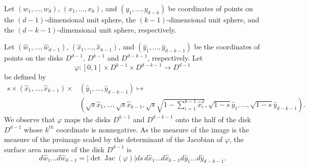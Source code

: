 \documentclass[twoside,11pt]{article}
\newcommand{\rmv}[1]{}
\DeclareMathOperator{\Jac}{Jac}
\begin{document}
Let $(w_1, \ldots, w_d)$, $(x_1, \ldots,x_k)$, and $(y_1, \ldots, y_{d-k})$ be coordinates of points on the $(d-1)$-dimensional unit sphere, 
			the $(k-1)$-dimensional unit sphere, and the $(d-k-1)$-dimensional unit sphere, respectively. 
\rmv{			
To show $\Psi$ is onto, consider an arbitrary $w \in S^{d-1}$, and let $s = \sum_{i=1}^k w_i^2$. Then, $1-s = \sum_{i=k+1}^d w_i^2$. As a result, $w$ can be 
			decomposed into two unit vectors scaled by $\sqrt{s}$ and $\sqrt{1-s}$, respectively. That is, when $s \in (0,1)$,
				\[w = \sqrt{s}\left(\frac{w_1}{\sqrt{s}}, \ldots, \frac{w_k}{\sqrt{s}}\right) \times \sqrt{1-s}\left(\frac{w_{k+1}}{\sqrt{1-s}}, \ldots, \frac{w_d}{\sqrt{1-s}}\right).\]
			If $s =0$, $w= 0 (1,0, \ldots, 0) \times 1(w_{k+1}, \ldots, w_d)$. If $s=1$, then $w=1(w_1, \ldots, w_k) \times 0 (1,0, \ldots, 0)$.			
			Therefore, we let $x= \left(\frac{w_1}{\sqrt{s}}, \ldots, \frac{w_k}{\sqrt{s}}\right) $ and $y=\left(\frac{w_{k+1}}{\sqrt{1-s}}, \ldots, \frac{w_d}{\sqrt{1-s}}\right)$ when $s \in (0,1)$; 
			$x=e_1$ and $y = (w_{k+1}, \ldots, w_d)$ when $s=0$; and $x=(w_1, \ldots, w_k)$ and $y=e_1$ when $s=1$. We 
			observe that 
			$x \in S^{k-1}$ and $y \in S^{d-k-1}$ and that $\Psi(s,x,y)=w$.
}			
Let $(\hat{w}_1,  \ldots, \hat{w}_{d-1})$, $(\hat{x}_1, \ldots,\hat{x}_{k-1})$, and $(\hat{y}_1, \ldots, \hat{y}_{d-k-1})$ be the coordinates of points on the disks $D^{d-1}$, 
$D^{k-1}$ and $D^{d-k-1}$, respectively.	Let
				\[\varphi: [0,1] \times D^{k-1} \times D^{d-k-1} \rightarrow D^{d-1}\]
be defined by 
				\begin{align*}
				s \times (\hat{x}_1, \ldots, \hat{x}_{k-1}) \times & (\hat{y}_1, \ldots, \hat{y}_{d-k-1}) \mapsto \\
				 & \left( \sqrt{s}\hat{x}_1, \ldots, \sqrt{s}\hat{x}_{k-1},\sqrt{s} 
				\sqrt{1-\sum_{i=1}^{k-1} \hat{x}_i^2} ,  \sqrt{1-s} \hat{y}_1, \ldots, \sqrt{1-s} \hat{y}_{d-k-1} \right).
				\end{align*}
			We observe that $\varphi$ maps the disks $D^{k-1}$ and $D^{d-k-1}$ onto the half of the disk $D^{d-1}$ whose $k^{th}$ coordinate is nonnegative.
	As the measure of the image is the measure 
			of the preimage scaled by the determinant of the Jacobian of $\varphi$, the surface area measure of the disk $D^{d-1}$ is
				\begin{equation} \label{Eq: det_disks}
					d\hat{w}_1 \dots d\hat{w}_{d-1} = |\det \Jac( \varphi)	| ds\,d\hat{x}_1 \dots d\hat{x}_{k-1}  d\hat{y}_1 \dots d\hat{y}_{d-k-1}.
				\end{equation}	 
\end{document}
